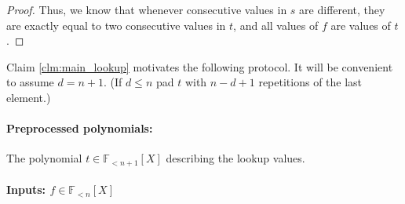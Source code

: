 \documentclass[11pt]{article} %
\newcommand{\F}{\ensuremath{\mathbb F}\xspace}
\newcommand{\polysofdeg}[1]{\ensuremath{\F_{< #1}[X]}\xspace}
\begin{document}
\begin{proof}
 Thus, we know that whenever consecutive values in $s$ are different, they are exactly equal to two consecutive values in $t$, and all values of $f$ are values of $t$.
 
 \end{proof}
 
 Claim \ref{clm:main_lookup} motivates the following protocol. 
It will be convenient to assume $d=n+1$. (If $d\leq n$ pad $t$ with $n-d+1$ repetitions of the last element.)
 \paragraph{Preprocessed polynomials:}
The polynomial $t \in \polysofdeg{n+1}$  describing the lookup values.


\paragraph{Inputs: $f\in \polysofdeg{n}$}
\end{document}
